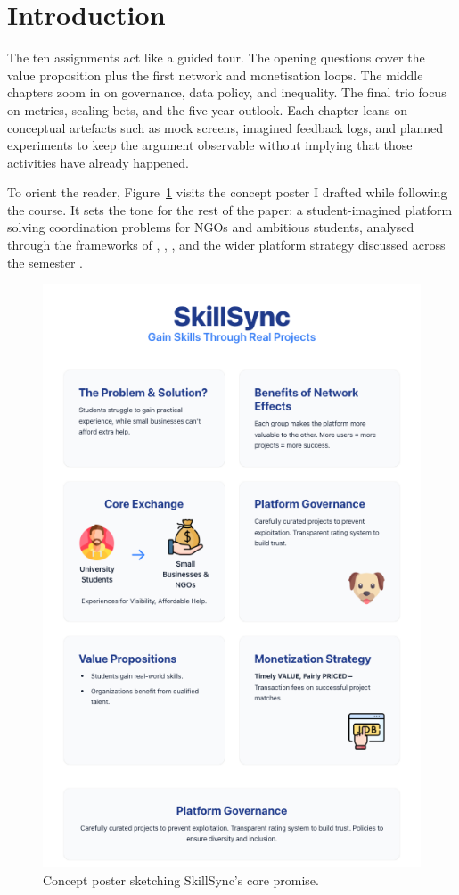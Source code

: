 \documentclass[12pt,a4paper]{article}
\begin{document}
\tableofcontents
\newpage

\section*{Introduction}
The ten assignments act like a guided tour. The opening questions cover the value proposition plus the first network and monetisation loops. The middle chapters zoom in on governance, data policy, and inequality. The final trio focus on metrics, scaling bets, and the five-year outlook. Each chapter leans on conceptual artefacts such as mock screens, imagined feedback logs, and planned experiments to keep the argument observable without implying that those activities have already happened.

To orient the reader, Figure~\ref{fig:intro-showcase} visits the concept poster I drafted while following the course. It sets the tone for the rest of the paper: a student-imagined platform solving coordination problems for NGOs and ambitious students, analysed through the frameworks of \citet{Choudary2016}, \citet{Srnicek2017}, \citet{Reillier2017}, and the wider platform strategy  discussed across the semester \citep{Lecture01,Lecture03,Lecture05}.

\begin{figure}[H]
  \centering
  \includegraphics[width=0.5\linewidth]{figures/Poster.png}
  \caption{Concept poster sketching SkillSync's core promise.}
  \label{fig:intro-showcase}
\end{figure}













\newpage


\end{document}
